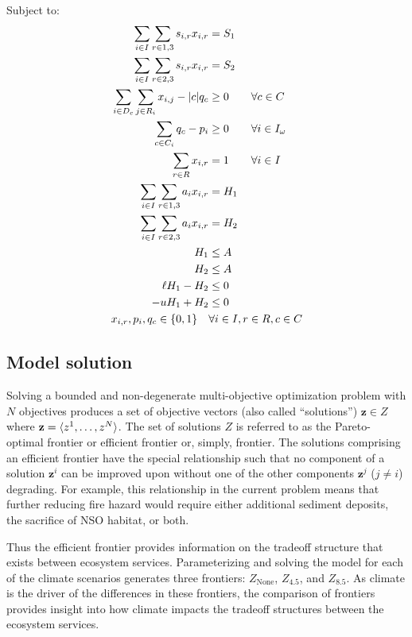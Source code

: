 Subject to:
\begin{align}
\sum_{i\in I} \sum_{r\in 1,3} s_{i,r} x_{i,r} &= S_1 \notag\\
\sum_{i\in I} \sum_{r\in 2,3} s_{i,r} x_{i,r} &= S_2 \notag\\
\sum_{i \in D_c} \sum_{j \in R_i}x_{i,j} - |c| q_c &\ge 0 \qquad \forall c \in C \notag\\
\sum_{c \in C_i} q_c - p_i &\ge 0 \qquad \forall i \in I_\omega \notag\\
\sum_{r \in R} x_{i,r} &= 1  \qquad \forall i \in I \notag\\
\sum_{i \in I} \sum_{r \in 1,3} a_i x_{i,r} &= H_1 \notag\\
\sum_{i \in I} \sum_{r \in 2,3} a_i x_{i,r} &= H_2 \notag\\
H_1 &\le A \notag\\
H_2 &\le A \notag\\
\ell H_1 - H_2 &\le 0 \notag\\
-u H_1 + H_2 &\le 0 \notag\\
x_{i,r}, p_i, q_c \in \{0,1\} \quad &\forall i \in I, r \in R, c \in C \label{eqn:constraintNonNeg}
\end{align}

\subsection{Model solution}
Solving a bounded and non-degenerate multi-objective optimization problem with $N$ objectives produces a set of objective vectors (also called ``solutions'') $\mathbf{z} \in Z$ where $\mathbf{z}=\braket{z^1,\ldots,z^N}$. The set of solutions $Z$ is referred to as the Pareto-optimal frontier or efficient frontier or, simply, frontier. The solutions comprising an efficient frontier have the special relationship such that no component of a solution $\mathbf{z}^i$ can be improved upon without one of the other components $\mathbf{z}^j$ ($j \neq i$) degrading. For example, this relationship in the current problem means that further reducing fire hazard would require either additional sediment deposits, the sacrifice of NSO habitat, or both.

Thus the efficient frontier provides information on the tradeoff structure that exists between ecosystem services. Parameterizing and solving the model for each of the climate scenarios generates three frontiers: $Z_{\text{None}}$, $Z_{4.5}$, and $Z_{8.5}$. As climate is the driver of the differences in these frontiers, the comparison of frontiers provides insight into how climate impacts the tradeoff structures between the ecosystem services.


